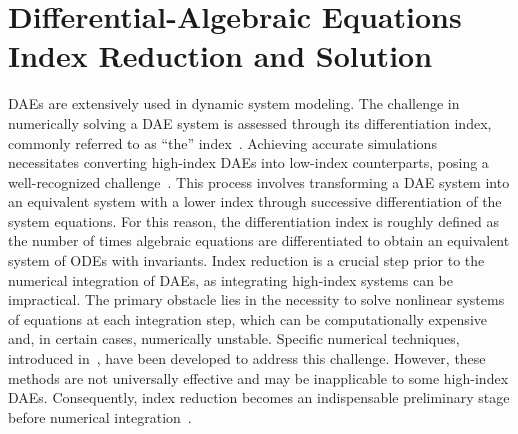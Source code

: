 
\section{Differential-Algebraic Equations Index Reduction and Solution}
\label{chap3:sec:introduction}

\acp{DAE} are extensively used in dynamic system modeling. The challenge in numerically solving a \ac{DAE} system is assessed through its differentiation index, commonly referred to as ``the'' index~\cite{campbell1995index}. Achieving accurate simulations necessitates converting high-index \acp{DAE} into low-index counterparts, posing a well-recognized challenge~\cite{petzold1982differential}. This process involves transforming a \ac{DAE} system into an equivalent system with a lower index through successive differentiation of the system equations. For this reason, the differentiation index is roughly defined as the number of times algebraic equations are differentiated to obtain an equivalent system of \acp{ODE} with invariants. Index reduction is a crucial step prior to the numerical integration of \acp{DAE}, as integrating high-index systems can be impractical. The primary obstacle lies in the necessity to solve nonlinear systems of equations at each integration step, which can be computationally expensive and, in certain cases, numerically unstable. Specific numerical techniques, introduced in~\cite{petzold1982differential, thomsen1999numerical, baumgarte1972stabilization}, have been developed to address this challenge. However, these methods are not universally effective and may be inapplicable to some high-index \acp{DAE}. Consequently, index reduction becomes an indispensable preliminary stage before numerical integration~\cite{lamour2013differential}.

